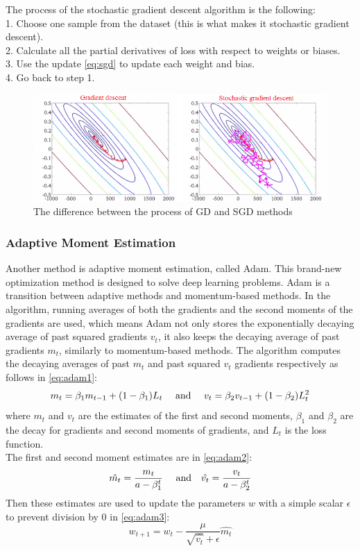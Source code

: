 \noindent The process of the stochastic gradient descent algorithm is the following:\\
1. Choose one sample from the dataset (this is what makes it stochastic gradient descent).\\
2. Calculate all the partial derivatives of loss with respect to weights or biases. \\
3. Use the update \autoref{eq:sgd} to update each weight and bias.\\
4. Go back to step 1.

\begin{figure}[h]
	\centering
	\includegraphics[height=0.28\linewidth]{./figures/stochastic}
	\caption{The difference between the process of GD and SGD methods}
	\label{fig:stochastic}
\end{figure}


\subsubsection{Adaptive Moment Estimation}

Another method is adaptive moment estimation, called Adam. This brand-new optimization method is designed to solve deep learning problems. Adam is a transition between adaptive methods and momentum-based methods. In the algorithm, running averages of both the gradients and the second moments of the gradients are used, which means Adam not only stores the exponentially decaying average of past squared gradients $v_t$, it also keeps the decaying average of past gradients $m_t$, similarly to momentum-based methods. The algorithm computes the decaying averages of past $m_t$ and past squared $v_t$ gradients respectively as follows in \autoref{eq:adam1}:
\begin{equation} m_t = \beta_1 m_{t-1} + (1-\beta_1)L_t ~~~~\hbox{and}~~~\ v_t = \beta_2 v_{t-1} + (1-\beta_2)L^2_t \label{eq:adam1} \end{equation}
where $m_t$ and $v_t$ are the estimates of the first and second moments, $\beta_1$ and $\beta_2$ are the decay for gradients and second moments of gradients, and $L_t$ is the loss function.\\
The first and second moment estimates are in \autoref{eq:adam2}:
\begin{equation} \hat{m_t} = \frac{m_t}{a-\beta^t_1} ~~~~\hbox{and}~~~ \hat{v_t} = \frac{v_t}{a-\beta^t_2} \label{eq:adam2} \end{equation}
Then these estimates are used to update the parameters $w$ with a simple scalar $\epsilon$ to prevent division by 0 in \autoref{eq:adam3}:
\begin{equation} w_{t+1} = w_t - \frac{\mu}{\sqrt{\hat{v_t}}+\epsilon}\hat{m_t} \label{eq:adam3} \end{equation}


